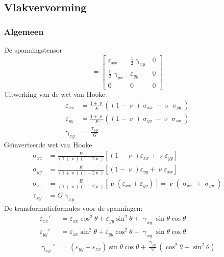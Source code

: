         \subsection{Vlakvervorming}

            \subsubsection{Algemeen}

            De spanningstensor
            \begin{equation}
                [\sigma] = \left[\begin{matrix}
                    \varepsilon_{xx} & \frac{1}{2}\upgamma_{xy} & 0 \\
                    \frac{1}{2}\upgamma_{yx} & \varepsilon_{yy} & 0 \\
                    0 & 0 & 0
                \end{matrix}\right]
            \end{equation}
            Uitwerking van de wet van Hooke:
            \begin{align}
                \varepsilon_{xx} &= \frac{1+\upnu}{E}\left((1-\upnu)\upsigma_{xx} - \upnu\upsigma_{yy}\right)\nonumber\\
                \varepsilon_{yy} &= \frac{1+\upnu}{E}\left((1-\upnu)\upsigma_{yy} - \upnu\upsigma_{xx}\right)\\
                \upgamma_{xy} &= \frac{\uptau_{xy}}{G}\nonumber
            \end{align}
            Geïnverteerde wet van Hooke
            \begin{align}
                \upsigma_{xx} &= \frac{E}{(1+\upnu)(1-2\upnu)}\left[(1-\upnu)\varepsilon_{xx}+\upnu\varepsilon_{yy}\right]\nonumber\\
                \upsigma_{yy} &= \frac{E}{(1+\upnu)(1-2\upnu)}\left[(1-\upnu)\varepsilon_{yy}+\upnu\varepsilon_{xx}\right]\nonumber\\
                \upsigma_{zz} &= \frac{E}{(1+\upnu)(1-2\upnu)}\left[\upnu(\varepsilon_{xx}+\varepsilon_{yy})\right] = \upnu(\upsigma_{xx}+\upsigma_{yy})\\
                \uptau_{xy} &= G\upgamma_{xy}\nonumber
            \end{align}
            De transformatieformules voor de spanningen:
            \begin{align}
                \varepsilon_{xx}' &= \varepsilon_{xx}\cos^2\theta+\varepsilon_{yy}\sin^2\theta + \upgamma_{xy}\sin\theta\cos\theta\nonumber\\
                \varepsilon_{yy}' &= \varepsilon_{xx}\sin^2\theta+\varepsilon_{yy}\cos^2\theta - \upgamma_{xy}\sin\theta\cos\theta\\
                \upgamma_{xy}' &= (\varepsilon_{yy}-\varepsilon_{xx})\sin\theta\cos\theta + \frac{\upgamma_{xy}}{2}\left(\cos^2\theta - \sin^2\theta\right)\nonumber
            \end{align}
